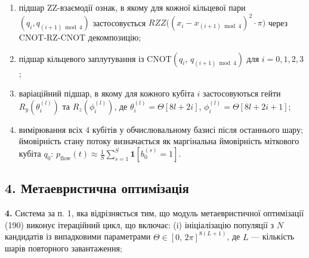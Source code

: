 \documentclass[12pt,a4paper]{article}
\begin{document}
\begin{enumerate}

\def\labelenumi{(\roman{enumi})}

\setcounter{enumi}{1}

\item

  підшар ZZ-взаємодії ознак, в якому для кожної кільцевої пари \((q_i, q_{(i+1) \bmod 4})\) застосовується \(RZZ\bigl((x_i - x_{(i+1) \bmod 4})^2 \cdot \pi\bigr)\) через CNOT-RZ-CNOT декомпозицію;

\item

  підшар кільцевого заплутування із \(\text{CNOT}(q_i,\,q_{(i+1) \bmod 4})\) для \(i = 0, 1, 2, 3\);

\item

  варіаційний підшар, в якому для кожного кубіта \(i\) застосовуються гейти \(R_y(\theta_i^{(l)})\) та \(R_z(\phi_i^{(l)})\), де \(\theta_i^{(l)} = \Theta[8l + 2i]\), \(\phi_i^{(l)} = \Theta[8l + 2i + 1]\);

\item

  вимірювання всіх 4 кубітів у обчислювальному базисі після останнього шару; ймовірність стану потоку визначається як маргінальна ймовірність міткового кубіта \(q_0\): \(p_{\text{flow}}(t) \approx \frac{1}{S}\sum_{s=1}^{S}\mathbf{1}[b_0^{(s)}=1]\).

\end{enumerate}



\subsection{4. Метаевристична оптимізація}\label{ux43cux435ux442ux430ux435ux432ux440ux438ux441ux442ux438ux447ux43dux430-ux43eux43fux442ux438ux43cux456ux437ux430ux446ux456ux44f}



\textbf{4.} Система за п. 1, яка відрізняється тим, що модуль метаевристичної оптимізації (190) виконує ітераційний цикл, що включає: (i) ініціалізацію популяції з \(N\) кандидатів із випадковими параметрами \(\Theta \in [0,\,2\pi]^{8(L+1)}\), де \(L\) --- кількість шарів повторного завантаження;
\end{document}
